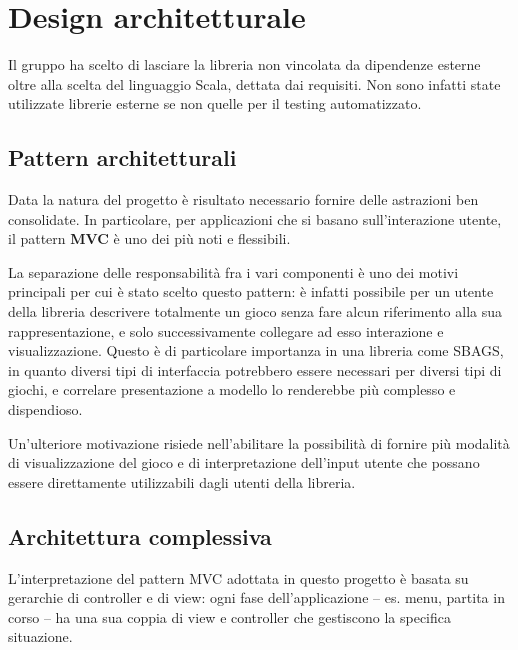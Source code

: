 \section{Design architetturale}

Il gruppo ha scelto di lasciare la libreria non vincolata da dipendenze esterne oltre alla scelta del linguaggio Scala, dettata dai requisiti.
%
Non sono infatti state utilizzate librerie esterne se non quelle per il testing automatizzato.


\subsection{Pattern architetturali}

Data la natura del progetto è risultato necessario fornire delle astrazioni ben consolidate.
%
In particolare, per applicazioni che si basano sull'interazione utente, il pattern \textbf{MVC} è uno dei più noti e flessibili.

La separazione delle responsabilità fra i vari componenti è uno dei motivi principali per cui è stato scelto questo pattern: è infatti possibile per un utente della libreria descrivere totalmente un gioco senza fare alcun riferimento alla sua rappresentazione, e solo successivamente collegare ad esso interazione e visualizzazione.
%
Questo è di particolare importanza in una libreria come SBAGS, in quanto diversi tipi di interfaccia potrebbero essere necessari per diversi tipi di giochi, e correlare presentazione a modello lo renderebbe più complesso e dispendioso.

Un'ulteriore motivazione risiede nell'abilitare la possibilità di fornire più modalità di visualizzazione del gioco e di interpretazione dell'input utente che possano essere direttamente utilizzabili dagli utenti della libreria.


\subsection{Architettura complessiva}

L'interpretazione del pattern MVC adottata in questo progetto è basata su gerarchie di controller e di view: ogni fase dell'applicazione -- es. menu, partita in corso -- ha una sua coppia di view e controller che gestiscono la specifica situazione.

